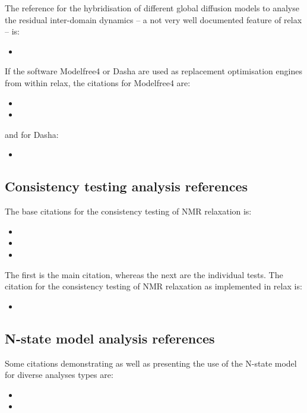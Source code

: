 The reference for the hybridisation of different global diffusion models to analyse the residual inter-domain dynamics -- a not very well documented feature of relax -- is:
\begin{itemize}
  \item {}
\end{itemize}

If the software Modelfree4 or Dasha are used as replacement optimisation engines from within relax, the citations for Modelfree4 are:
\begin{itemize}
  \item {}
  \item {}
\end{itemize}

and for Dasha:
\begin{itemize}
  \item {}
\end{itemize}



\subsection*{Consistency testing analysis references}

The base citations for the consistency testing of NMR relaxation is:
\begin{itemize}
  \item {}
  \item {}
  \item {}
\end{itemize}

The first is the main citation, whereas the next are the individual tests.
The citation for the consistency testing of NMR relaxation as implemented in relax is:
\begin{itemize}
  \item {}
\end{itemize}



\subsection*{N-state model analysis references}

Some citations demonstrating as well as presenting the use of the N-state model for diverse analyses types are:
\begin{itemize}
  \item {}
  \item {}
\end{itemize}


